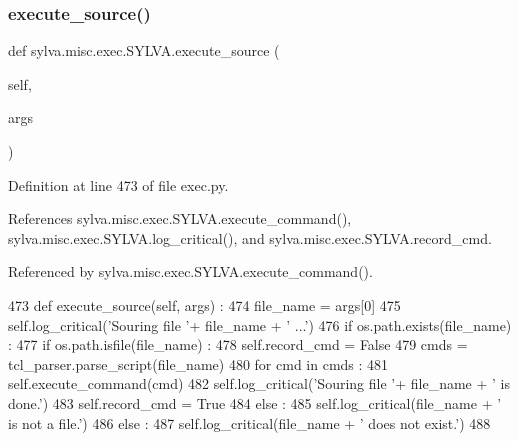 \subsubsection{\texorpdfstring{execute\+\_\+source()}{execute\_source()}}
{\footnotesize\ttfamily def sylva.\+misc.\+exec.\+S\+Y\+L\+V\+A.\+execute\+\_\+source (\begin{DoxyParamCaption}\item[{}]{self,  }\item[{}]{args }\end{DoxyParamCaption})}



Definition at line 473 of file exec.\+py.



References sylva.\+misc.\+exec.\+S\+Y\+L\+V\+A.\+execute\+\_\+command(), sylva.\+misc.\+exec.\+S\+Y\+L\+V\+A.\+log\+\_\+critical(), and sylva.\+misc.\+exec.\+S\+Y\+L\+V\+A.\+record\+\_\+cmd.



Referenced by sylva.\+misc.\+exec.\+S\+Y\+L\+V\+A.\+execute\+\_\+command().


\begin{DoxyCode}
473   \textcolor{keyword}{def }execute\_source(self, args) :
474     file\_name = args[0]
475     self.log\_critical(\textcolor{stringliteral}{'Souring file '}+ file\_name + \textcolor{stringliteral}{' ...'})
476     \textcolor{keywordflow}{if} os.path.exists(file\_name) :
477       \textcolor{keywordflow}{if} os.path.isfile(file\_name) :
478         self.record\_cmd = \textcolor{keyword}{False}
479         cmds = tcl\_parser.parse\_script(file\_name)
480         \textcolor{keywordflow}{for} cmd \textcolor{keywordflow}{in} cmds :
481           self.execute\_command(cmd)
482         self.log\_critical(\textcolor{stringliteral}{'Souring file '}+ file\_name + \textcolor{stringliteral}{' is done.'})
483         self.record\_cmd = \textcolor{keyword}{True}
484       \textcolor{keywordflow}{else} :
485         self.log\_critical(file\_name + \textcolor{stringliteral}{' is not a file.'})
486     \textcolor{keywordflow}{else} :
487       self.log\_critical(file\_name + \textcolor{stringliteral}{' does not exist.'})
488 
\end{DoxyCode}
\mbox{\label{classsylva_1_1misc_1_1exec_1_1_s_y_l_v_a_a5e55481ef1b5394966f32c70c8acb08d}} 
